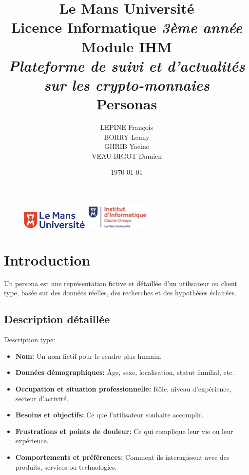\documentclass[a4paper,11pt]{article}
\begin{document}
\begin{figure}
\includegraphics[width=0.3\textwidth]{images/logolemansU.png}
\hspace{150pt} 
\includegraphics[width=0.3\textwidth]{images/logo_ic2.png} 
\end{figure}

\title{\textbf{\color{blue} Le Mans Université}\color{black}
\\ Licence Informatique \textit{3ème année}
\\ Module IHM
\\ \textit{Plateforme de suivi et d’actualités sur les crypto-monnaies}
\\ \textbf{Personas}}
\author{LEPINE François\\BORRY Lenny\\GHRIB Yacine\\VEAU-BIGOT Damien}
\date{\today} 
\maketitle 
\newpage

\tableofcontents
\newpage

\section{Introduction}
Un persona est une représentation fictive et détaillée d'un utilisateur ou client type, basée sur des données réelles, des recherches et des hypothèses éclairées.

\subsection{Description détaillée}
\noindent Description type:
\begin{itemize}
    \item \textbf{Nom:} Un nom fictif pour le rendre plus humain.
    \item \textbf{Données démographiques:} Âge, sexe, localisation, statut familial, etc.
    \item \textbf{Occupation et situation professionnelle:}  Rôle, niveau d'expérience, secteur d'activité.
    \item \textbf{Besoins et objectifs:} Ce que l'utilisateur souhaite accomplir.
    \item \textbf{Frustrations et points de douleur:} Ce qui complique leur vie ou leur expérience.
    \item \textbf{Comportements et préférences:} Comment ils interagissent avec des produits, services ou technologies.
\end{itemize}
\end{document}
